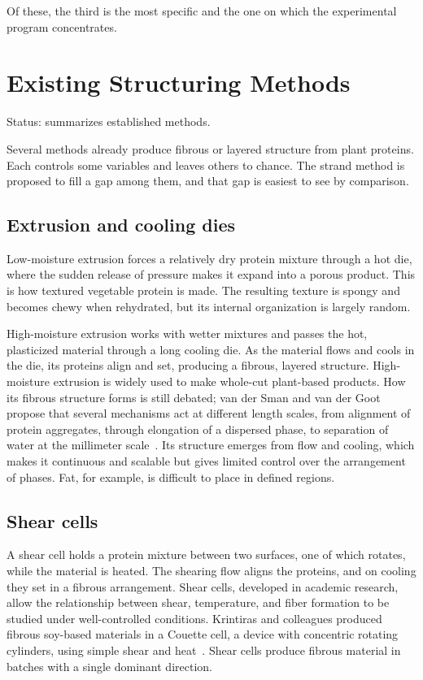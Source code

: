 \documentclass[11pt,openany]{book}
\theoremstyle{definition}
\begin{document}
Of these, the third is the most specific and the one on which the experimental program concentrates.

\chapter{Existing Structuring Methods}\label{ch:structuring}

Status: summarizes established methods.

Several methods already produce fibrous or layered structure from plant proteins. Each controls some variables and leaves others to chance. The strand method is proposed to fill a gap among them, and that gap is easiest to see by comparison.

\section{Extrusion and cooling dies}

Low-moisture extrusion forces a relatively dry protein mixture through a hot die, where the sudden release of pressure makes it expand into a porous product. This is how textured vegetable protein is made. The resulting texture is spongy and becomes chewy when rehydrated, but its internal organization is largely random.

High-moisture extrusion works with wetter mixtures and passes the hot, plasticized material through a long cooling die. As the material flows and cools in the die, its proteins align and set, producing a fibrous, layered structure. High-moisture extrusion is widely used to make whole-cut plant-based products. How its fibrous structure forms is still debated; van der Sman and van der Goot propose that several mechanisms act at different length scales, from alignment of protein aggregates, through elongation of a dispersed phase, to separation of water at the millimeter scale~\cite{vandersman2023}. Its structure emerges from flow and cooling, which makes it continuous and scalable but gives limited control over the arrangement of phases. Fat, for example, is difficult to place in defined regions.

\section{Shear cells}

A shear cell holds a protein mixture between two surfaces, one of which rotates, while the material is heated. The shearing flow aligns the proteins, and on cooling they set in a fibrous arrangement. Shear cells, developed in academic research, allow the relationship between shear, temperature, and fiber formation to be studied under well-controlled conditions. Krintiras and colleagues produced fibrous soy-based materials in a Couette cell, a device with concentric rotating cylinders, using simple shear and heat~\cite{krintiras2015}. Shear cells produce fibrous material in batches with a single dominant direction.
\end{document}
